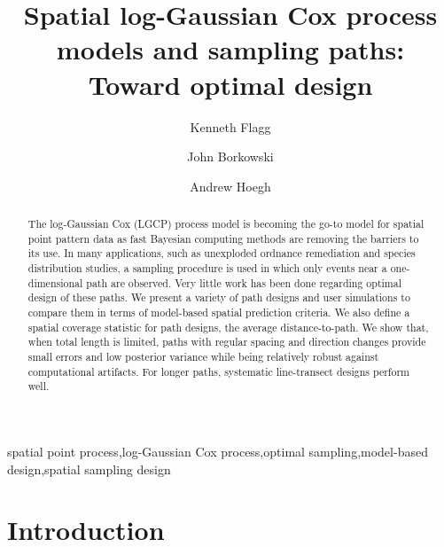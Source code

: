 \documentclass[review]{elsarticle}
\begin{document}
\begin{frontmatter}

\title{Spatial log-Gaussian Cox process models and sampling paths: Toward optimal design}

\author[msuaddr]{Kenneth Flagg}

\author[msuaddr]{John Borkowski}
\author[msuaddr]{Andrew Hoegh}

\address[msuaddr]{Department of Mathematical Sciences, Montana State University, Bozeman, MT 59717}

\begin{abstract}

The log-Gaussian Cox (LGCP) process model is becoming the go-to model for
spatial point pattern data as fast Bayesian computing methods are removing the
barriers to its use. In many applications, such as unexploded ordnance
remediation and species distribution studies, a sampling procedure is used in
which only events near a one-dimensional path are observed. Very little work
has been done regarding optimal design of these paths. We present a variety of
path designs and user simulations to compare them in terms of model-based
spatial prediction criteria. We also define a spatial coverage statistic for
path designs, the average distance-to-path. We show that, when total length is
limited, paths with regular spacing and direction changes provide small errors
and low posterior variance while being relatively robust against computational
artifacts. For longer paths, systematic line-transect designs perform well.

\end{abstract}

\begin{keyword}
spatial point process\sep log-Gaussian Cox process\sep optimal sampling\sep model-based design\sep spatial sampling design
\end{keyword}

\end{frontmatter}

\linenumbers



\section{Introduction}
\end{document}
